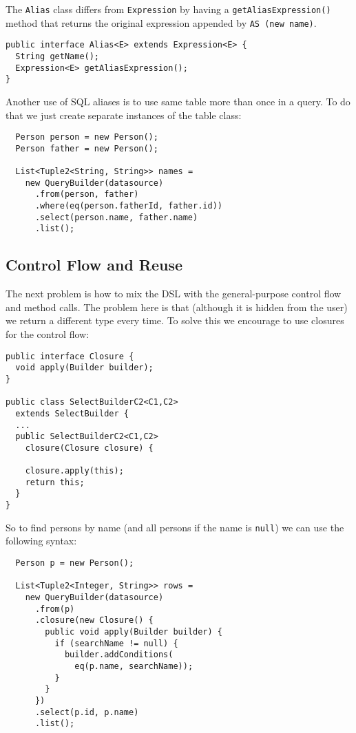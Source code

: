 \documentclass{sig-alternate}
\begin{document}
The \verb!Alias! class differs from \verb!Expression! by having a \verb!getAliasExpression()! method that returns the original expression appended by \verb!AS (new name)!. 

\begin{verbatim}
public interface Alias<E> extends Expression<E> {
  String getName();
  Expression<E> getAliasExpression();
}
\end{verbatim}
 
Another use of SQL aliases is to use same table more than once in a query. To do that we just create separate instances of the table class:

\begin{verbatim}
  Person person = new Person();
  Person father = new Person();
		
  List<Tuple2<String, String>> names =
    new QueryBuilder(datasource)
      .from(person, father)
      .where(eq(person.fatherId, father.id))
      .select(person.name, father.name)
      .list();
\end{verbatim}

\subsection{Control Flow and Reuse}

The next problem is how to mix the DSL with the general-purpose control flow and method calls. The problem here is that (although it is hidden from the user) we return a different type every time. To solve this we encourage to use closures for the control flow:

\begin{verbatim}
public interface Closure {
  void apply(Builder builder);
}

public class SelectBuilderC2<C1,C2> 
  extends SelectBuilder {
  ...
  public SelectBuilderC2<C1,C2> 
    closure(Closure closure) {

    closure.apply(this);
    return this;
  }
}
\end{verbatim}

So to find persons by name (and all persons if the name is \verb!null!) we can use the following syntax:

\begin{verbatim}
  Person p = new Person();

  List<Tuple2<Integer, String>> rows =
    new QueryBuilder(datasource)
      .from(p)
      .closure(new Closure() {
        public void apply(Builder builder) {
          if (searchName != null) {
            builder.addConditions(
              eq(p.name, searchName));
          }
        }
      })
      .select(p.id, p.name)
      .list();
\end{verbatim}
\end{document}
